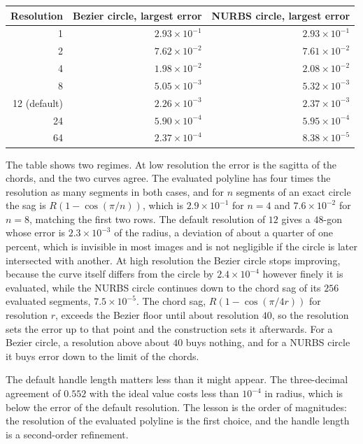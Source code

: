 \begin{center}
\begin{tabular}{rrr}
\toprule
Resolution & Bezier circle, largest error & NURBS circle, largest error\\
\midrule
1 & $2.93\times10^{-1}$ & $2.93\times10^{-1}$\\
2 & $7.62\times10^{-2}$ & $7.61\times10^{-2}$\\
4 & $1.98\times10^{-2}$ & $2.08\times10^{-2}$\\
8 & $5.05\times10^{-3}$ & $5.32\times10^{-3}$\\
12 (default) & $2.26\times10^{-3}$ & $2.37\times10^{-3}$\\
24 & $5.90\times10^{-4}$ & $5.95\times10^{-4}$\\
64 & $2.37\times10^{-4}$ & $8.38\times10^{-5}$\\
\bottomrule
\end{tabular}
\end{center}

The table shows two regimes. At low resolution the error is the sagitta of the chords, and the two curves agree. The evaluated polyline has four times the resolution as many segments in both cases, and for $n$ segments of an exact circle the sag is $R(1-\cos(\pi/n))$, which is $2.9\times10^{-1}$ for $n=4$ and $7.6\times10^{-2}$ for $n=8$, matching the first two rows. The default resolution of $12$ gives a $48$-gon whose error is $2.3\times10^{-3}$ of the radius, a deviation of about a quarter of one percent, which is invisible in most images and is not negligible if the circle is later intersected with another. At high resolution the Bezier circle stops improving, because the curve itself differs from the circle by $2.4\times10^{-4}$ however finely it is evaluated, while the NURBS circle continues down to the chord sag of its $256$ evaluated segments, $7.5\times10^{-5}$. The chord sag, $R(1-\cos(\pi/4r))$ for resolution $r$, exceeds the Bezier floor until about resolution $40$, so the resolution sets the error up to that point and the construction sets it afterwards. For a Bezier circle, a resolution above about $40$ buys nothing, and for a NURBS circle it buys error down to the limit of the chords.

The default handle length matters less than it might appear. The three-decimal agreement of $0.552$ with the ideal value costs less than $10^{-4}$ in radius, which is below the error of the default resolution. The lesson is the order of magnitudes: the resolution of the evaluated polyline is the first choice, and the handle length is a second-order refinement.

